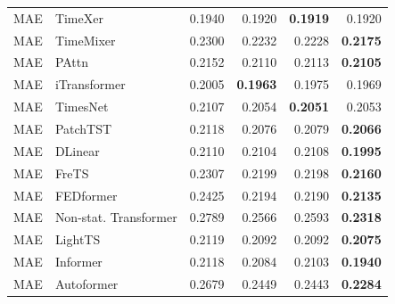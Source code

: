 \begin{longtable}{llrrrr}
\midrule
MAE & TimeXer & 0.1940 & 0.1920 & \textbf{0.1919} & 0.1920 \\
MAE & TimeMixer & 0.2300 & 0.2232 & 0.2228 & \textbf{0.2175} \\
MAE & PAttn & 0.2152 & 0.2110 & 0.2113 & \textbf{0.2105} \\
MAE & iTransformer & 0.2005 & \textbf{0.1963} & 0.1975 & 0.1969 \\
MAE & TimesNet & 0.2107 & 0.2054 & \textbf{0.2051} & 0.2053 \\
MAE & PatchTST & 0.2118 & 0.2076 & 0.2079 & \textbf{0.2066} \\
MAE & DLinear & 0.2110 & 0.2104 & 0.2108 & \textbf{0.1995} \\
MAE & FreTS & 0.2307 & 0.2199 & 0.2198 & \textbf{0.2160} \\
MAE & FEDformer & 0.2425 & 0.2194 & 0.2190 & \textbf{0.2135} \\
MAE & Non-stat. Transformer & 0.2789 & 0.2566 & 0.2593 & \textbf{0.2318} \\
MAE & LightTS & 0.2119 & 0.2092 & 0.2092 & \textbf{0.2075} \\
MAE & Informer & 0.2118 & 0.2084 & 0.2103 & \textbf{0.1940} \\
MAE & Autoformer & 0.2679 & 0.2449 & 0.2443 & \textbf{0.2284} \\
\end{longtable}
\endgroup

